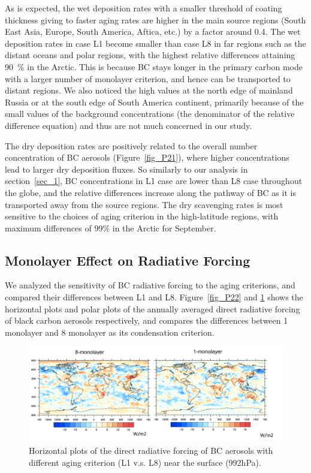 \documentclass[12pt, fullpage]{uiucthesis2009}
\begin{document}
	As is expected, the wet deposition rates with a smaller threshold of coating thickness giving to faster aging rates are higher in the main source regions (South East Asia, Europe, South America, Aftica, etc.) by a factor around 0.4. The wet deposition rates in case L1 become smaller than case L8 in far regions such as the distant oceans and polar regions, with the highest relative differences attaining 90~$\%$ in the Arctic. This is because BC stays longer in the primary carbon mode with a larger number of monolayer criterion, and hence can be transported to distant regions. We also noticed the high values at the north edge of mainland Russia or at the south edge of South America continent, primarily because of the small values of the background concentrations (the denominator of the relative difference equation) and thus are not much concerned in our study.
	
	The dry deposition rates are positively related to the overall number concentration of BC aerosols (Figure~\ref{fig_P21}), where higher concentrations lead to larger dry deposition fluxes. So similarly to our analysis in section~\ref{sec_1}, BC concentrations in L1 case are lower than L8 case throughout the globe, and the relative differences increase along the pathway of BC as it is transported away from the source regions. The dry scavenging rates is most sensitive to the choices of aging criterion in the high-latitude regions, with maximum differences of 99$\%$ in the Arctic for September.  
	
	
	\subsection{Monolayer Effect on Radiative Forcing }
	We analyzed the sensitivity of BC radiative forcing to the aging criterions, and compared their differences between L1 and L8. Figure~\ref{fig_P22} and \ref{fig_P23} shows the horizontal plots and polar plots of the annually averaged direct radiative forcing of black carbon aerosols respectively, and compares the differences between 1 monolayer and 8 monolayer as its condensation criterion. 
	\begin{figure}[h] 
		\begin{center}
			\includegraphics[width = 1\textwidth]{Figure23}
			\caption[Horizontal plots of the direct radiative forcing of BC aerosols with different aging criterion (L1 v.s. L8) near the surface (992hPa)]{\label{fig_P23} Horizontal plots of the direct radiative forcing of BC aerosols with different aging criterion (L1 v.s. L8) near the surface (992hPa).}
		\end{center}
	\end{figure}
	
\end{document}
